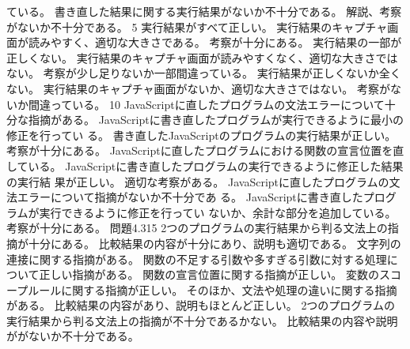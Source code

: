 {{{ ている。}
 {書き直した結果に関する実行結果がないか不十分である。}
 {解説、考察がないか不十分である。}
 }
 {}{5}
 {
 {実行結果がすべて正しい。}
 {実行結果のキャプチャ画面が読みやすく、適切な大きさである。}
 {考察が十分にある。}
 }
 {
 {実行結果の一部が正しくない。}
 {実行結果のキャプチャ画面が読みやすくなく、適切な大きさではない。}
 {考察が少し足りないか一部間違っている。}
 }
 {
 {実行結果が正しくないか全くない。}
 {実行結果のキャプチャ画面がないか、適切な大きさではない。}
 {考察がないか間違っている。}
 }
 {}{10}
 {
 {JavaScriptに直したプログラムの文法エラーについて十分な指摘がある。}
 {JavaScriptに書き直したプログラムが実行できるように最小の修正を行ってい
 る。}
 {書き直したJavaScriptのプログラムの実行結果が正しい。}
 {考察が十分にある。}
 }
 {
 {JavaScriptに直したプログラムにおける関数の宣言位置を直している。}
 {JavaScriptに書き直したプログラムの実行できるように修正した結果の実行結
 果が正しい。}
 {適切な考察がある。}
 }
 {
 {JavaScriptに直したプログラムの文法エラーについて指摘がないか不十分であ
 る。}
 {JavaScriptに書き直したプログラムが実行できるように修正を行ってい
 ないか、余計な部分を追加している。}
 {考察が十分にある。}
 }
 {問題4.3}{15}
 {
 {2つのプログラムの実行結果から判る文法上の指摘が十分にある。}
 {比較結果の内容が十分にあり、説明も適切である。}
 }
 {
 {文字列の連接に関する指摘がある。}
 {関数の不足する引数や多すぎる引数に対する処理について正しい指摘がある。}
 {関数の宣言位置に関する指摘が正しい。}
 {変数のスコープルールに関する指摘が正しい。}
 {そのほか、文法や処理の違いに関する指摘がある。}
 {比較結果の内容があり、説明もほとんど正しい。}
 }
 {
 {2つのプログラムの実行結果から判る文法上の指摘が不十分であるかない。}
 {比較結果の内容や説明ががないか不十分である。}
 }
 }